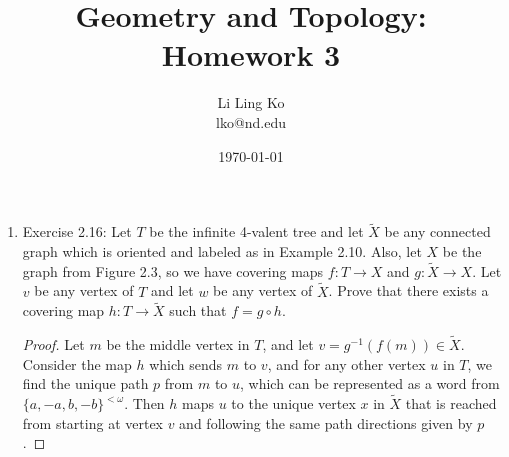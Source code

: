 \documentclass{article}
\begin{document}
\title{Geometry and Topology: Homework 3}
\author{Li Ling Ko\\ lko@nd.edu}
\date{\today}
\maketitle

\begin{enumerate}
  \item Exercise 2.16: Let $T$ be the infinite 4-valent tree and let
    $\tilde{X}$ be any connected graph which is oriented and labeled as in
    Example 2.10. Also, let $X$ be the graph from Figure 2.3, so we have
    covering maps $f:T\rightarrow X$ and $g:\tilde{X}\rightarrow X$. Let
    $v$ be any vertex of $T$ and let $w$ be any vertex of $\tilde{X}$.
    Prove that there exists a covering map $h:T\rightarrow\tilde{X}$ such
    that $f=g\circ h$.

    \begin{proof}
      Let $m$ be the middle vertex in $T$, and let
      $v=g^{-1}(f(m))\in\tilde{X}$. Consider the map $h$ which sends $m$
      to $v$, and for any other vertex $u$ in $T$, we find the unique path
      $p$ from $m$ to $u$, which can be represented as a word from
      $\{a,-a,b,-b\}^{<\omega}$. Then $h$ maps $u$ to the unique vertex
      $x$ in $\tilde{X}$ that is reached from starting at vertex $v$ and
      following the same path directions given by $p$.
    \end{proof}
\end{enumerate}
\end{document}
